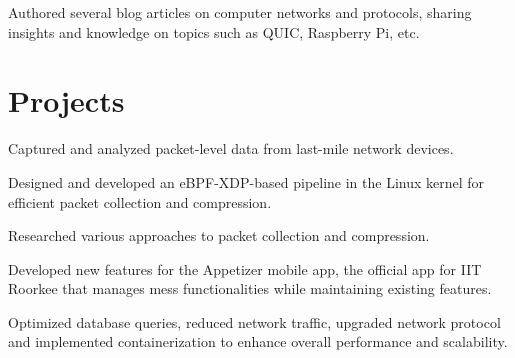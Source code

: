 \documentclass[letterpaper]{deedy-resume} %
\begin{document}
\begin{minipage}[t]{0.66\textwidth}
\sectionspace %

Authored several blog articles on computer networks and protocols, sharing insights and knowledge on topics such as QUIC, Raspberry Pi, etc.

\sectionspace %


\section{Projects} 

\begin{tightitemize}
\item Captured and analyzed packet-level data from last-mile network devices.
\item Designed and developed an eBPF-XDP-based pipeline in the Linux kernel for efficient packet collection and compression.
\item Researched various approaches to packet collection and compression.
\end{tightitemize}

\begin{tightitemize}
\item Developed new features for the Appetizer mobile app, the official app for IIT Roorkee that manages mess functionalities while maintaining existing features.
\item Optimized database queries, reduced network traffic, upgraded network protocol and implemented containerization to enhance overall performance and scalability.
\end{tightitemize}
\sectionspace %




\end{minipage}
\end{document}
